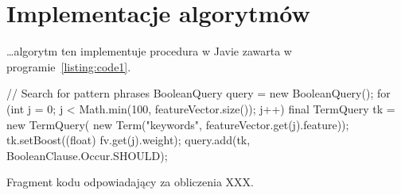 \documentclass[polish]{article}
\begin{document}
\section{Implementacje algorytmów}

\noindent\ldots algorytm ten implementuje procedura w Javie zawarta w programie~\vref{listing:code1}. 

\begin{Program}[p]
\begin{codeblock}
// Search for pattern phrases
BooleanQuery query = new BooleanQuery();
for (int j = 0; j < Math.min(100, featureVector.size()); j++) {
    final TermQuery tk = new TermQuery(
        new Term("keywords", featureVector.get(j).feature));
    tk.setBoost((float) fv.get(j).weight);
    query.add(tk, BooleanClause.Occur.SHOULD);
}
\end{codeblock}
\caption{Fragment kodu odpowiadający za obliczenia XXX.}\label{listing:code1}%
\end{Program}
\end{document}
